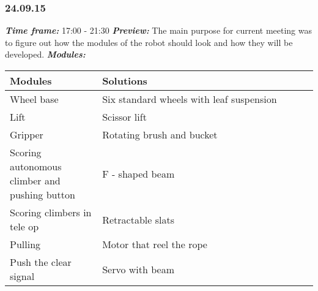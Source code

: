 
\subsubsection{24.09.15}
\textit{\textbf{Time frame:}} 17:00 - 21:30 \newline
\textit{\textbf{Preview:}} The main purpose for current meeting was to figure out how the modules of the robot should look and how they will be developed. \newline \newline
\textit{\textbf{Modules:}}

\begin{table}[H]
	\vspace{-2mm}
	\begin{center}
		\begin{tabular}{|p{0.3\linewidth}|p{0.7\linewidth}|}
			\hline
			Modules & Solutions \\
			\hline
			Wheel base & Six standard wheels with leaf suspension \\
			\hline
			Lift & Scissor lift \\
			\hline
			Gripper & Rotating brush and bucket \\
			\hline
			Scoring autonomous climber and pushing button & F - shaped beam \\
			\hline
			Scoring climbers in tele op & Retractable slats \\
			\hline
			Pulling & Motor that reel the rope \\
			\hline
			Push the clear signal & Servo with beam \\
			\hline
		\end{tabular}
	\end{center}
\end{table}

